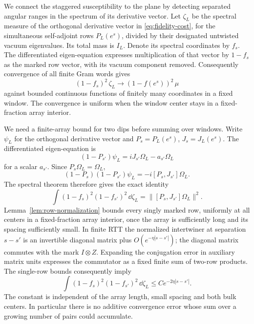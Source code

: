 We connect the staggered susceptibility to the plane by detecting
separated angular ranges in the spectrum of its derivative vector.
Let \(\zeta_L\) be the spectral measure of the orthogonal derivative vector
in \eqref{eq:fidelity-cost}, for the simultaneous self-adjoint rows
\(P_L(e^s)\), divided by their designated untwisted vacuum eigenvalues.
Its total mass is \(I_L\). Denote its spectral coordinates by \(f_s\).
The differentiated eigen-equation expresses multiplication of that vector
by \(1-f_s\) as the marked row vector, with its vacuum component removed.
Consequently convergence of all finite Gram words gives
\begin{equation}\label{eq:weighted-measure-convergence}
 (1-f_s)^2\,\zeta_L
       \longrightarrow (1-f(e^s))^2\,\mu
\end{equation}
against bounded continuous functions of finitely many coordinates in a
fixed window. The convergence is uniform when the window center stays
in a fixed-fraction array interior.

We need a finite-array bound for two dips before summing over windows.
Write \(\psi_L\) for the orthogonal derivative vector and
\(P_s=P_L(e^s)\), \(J_s=J_L(e^s)\). The differentiated eigen-equation is
\[
 (1-P_{s'})\psi_L=iJ_{s'}\Omega_L-a_{s'}\Omega_L
\]
for a scalar \(a_{s'}\). Since \(P_s\Omega_L=\Omega_L\),
\[
 (1-P_s)(1-P_{s'})\psi_L=-i[P_s,J_{s'}]\Omega_L.
\]
The spectral theorem therefore gives the exact identity
\[
 \int(1-f_s)^2(1-f_{s'})^2\,\dd\zeta_L
       =\|[P_s,J_{s'}]\Omega_L\|^2.
\]
Lemma~\ref{lem:row-normalization} bounds every singly marked row,
uniformly at all centers in a fixed-fraction array interior, once the
array is sufficiently long and its spacing sufficiently small.
In finite RTT the normalized intertwiner at separation \(s-s'\)
is an invertible diagonal matrix plus
\(O(e^{-\eta|s-s'|})\); the diagonal matrix commutes with the mark
\(I\otimes Z\). Expanding the conjugation error in auxiliary matrix
units expresses the commutator as a fixed finite sum of two-row products.
The single-row bounds consequently imply
\begin{equation}\label{eq:finite-two-dip}
 \int(1-f_s)^2(1-f_{s'})^2\,\dd\zeta_L
       \le C e^{-2\eta|s-s'|}.
\end{equation}
The constant is independent of the array length, small spacing and both
bulk centers. In particular there is no additive convergence error whose
sum over a growing number of pairs could accumulate.

